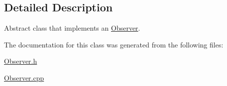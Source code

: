 \subsection{Detailed Description}
Abstract class that implements an \hyperlink{class_observer}{Observer}. 

The documentation for this class was generated from the following files\+:\begin{DoxyCompactItemize}
\item 
\hyperlink{_observer_8h}{Observer.\+h}\item 
\hyperlink{_observer_8cpp}{Observer.\+cpp}\end{DoxyCompactItemize}
